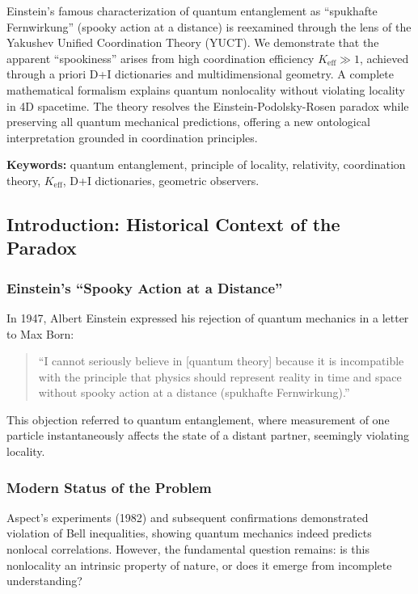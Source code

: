 \documentclass[11pt,a4paper]{article}
\begin{document}
	Einstein's famous characterization of quantum entanglement as ``spukhafte Fernwirkung'' (spooky action at a distance) is reexamined through the lens of the Yakushev Unified Coordination Theory (YUCT). We demonstrate that the apparent ``spookiness'' arises from high coordination efficiency $K_{\mathrm{eff}} \gg 1$, achieved through a priori D+I dictionaries and multidimensional geometry. A complete mathematical formalism explains quantum nonlocality without violating locality in 4D spacetime. The theory resolves the Einstein-Podolsky-Rosen paradox while preserving all quantum mechanical predictions, offering a new ontological interpretation grounded in coordination principles.
	
	\textbf{Keywords:} quantum entanglement, principle of locality, relativity, coordination theory, $K_{\mathrm{eff}}$, D+I dictionaries, geometric observers.
	
	\subsection{Introduction: Historical Context of the Paradox}
	\label{subsec:einstein-historical}
	
	\subsubsection{Einstein's ``Spooky Action at a Distance''}
	In 1947, Albert Einstein expressed his rejection of quantum mechanics in a letter to Max Born:
	
	\begin{quote}
		``I cannot seriously believe in [quantum theory] because it is incompatible with the principle that physics should represent reality in time and space without spooky action at a distance (spukhafte Fernwirkung).''
	\end{quote}
	
	This objection referred to quantum entanglement, where measurement of one particle instantaneously affects the state of a distant partner, seemingly violating locality.
	
	\subsubsection{Modern Status of the Problem}
	Aspect's experiments (1982) and subsequent confirmations demonstrated violation of Bell inequalities, showing quantum mechanics indeed predicts nonlocal correlations. However, the fundamental question remains: is this nonlocality an intrinsic property of nature, or does it emerge from incomplete understanding?
	
\end{document}

